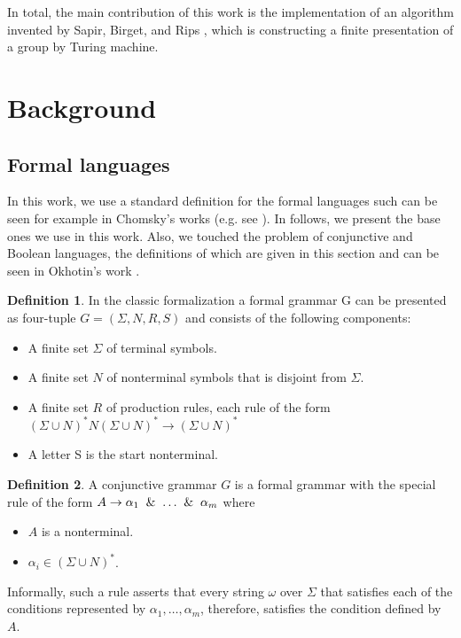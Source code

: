 \documentclass[conference]{IEEEtran}
\theoremstyle{definition}
\newtheorem{defn}{Definition}[section]
\begin{document}
In total, the main contribution of this work is the implementation of an algorithm invented by Sapir, Birget, and Rips \cite{Sapir}, which is constructing a finite presentation of a group by Turing machine.

\section{Background}
\subsection{Formal languages}

In this work, we use a standard definition for the formal languages such can be seen
for example in Chomsky's works (e.g. see \cite{chomsky1, chomsky2}).
In follows, we present the base ones we use in this work. 
Also, we touched the problem of conjunctive and Boolean languages, 
the definitions of which are given in this section
and can be seen in Okhotin's work \cite{OKHOTIN201327}. 

\begin{defn}
In the classic formalization a formal grammar G can be presented as four-tuple 
$G = (\Sigma, N, R, S)$ and consists of the following components:
\begin{itemize}
    \item A finite set $\Sigma$ of terminal symbols.
    \item A finite set $N$ of nonterminal symbols that is disjoint from $\Sigma$.
    \item A finite set $R$ of production rules, each rule of the form
    $(\Sigma \cup N)^{*}N(\Sigma \cup N)^{*} \to (\Sigma \cup N)^{*}$
    \item A letter S is the start nonterminal.
\end{itemize}
\end{defn}

\begin{defn}
A conjunctive grammar $G$ is a formal grammar with the special rule 
of the form 
$\\A \to \alpha_{1}\And \ldots \And \alpha_{m}$ where 
\begin{itemize}
    \item $A$ is a nonterminal.
    \item $\alpha_{i} \in (\Sigma \cup N)^*$.
\end{itemize}
Informally, such a rule asserts that every string $\omega$ over $\Sigma$ that satisfies each of the conditions represented by $\alpha _{1}, \dots, \alpha _{m}$, therefore, satisfies the condition defined by $A$.
\end{defn}
\end{document}
